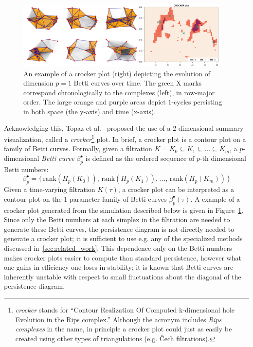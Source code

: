 \documentclass{siamart190516}
\begin{document}
\begin{figure}[t]
	\centering
	\includegraphics[width=0.95\textwidth]{crocker_combo_1.png}
	\caption{An example of a crocker plot (right) depicting the evolution of dimension $p = 1$ Betti curves over time. The green $\mathrm{X}$ marks correspond chronologically to the complexes (left), in row-major order. The large orange and purple areas depict $1$-cycles persisting in both space (the y-axis) and time (x-axis). }\label{fig:crocker1}
\end{figure}

Acknowledging this, Topaz et al.~\cite{topaz2015topological} proposed the use of a 2-dimensional summary visualization, called a \emph{crocker}\footnote{\emph{crocker} stands for ``Contour Realization Of Computed k-dimensional hole Evolution in the Rips complex.'' Although the acronym includes \emph{Rips complexes} in the name, in principle a crocker plot could just as easily be created using other types of triangulations (e.g. \v{C}ech filtrations).} plot. 
In brief, a crocker plot is a contour plot on a family of Betti curves. Formally, given a filtration $K = K_0 \subseteq K_1 \subseteq \dots \subseteq K_m$, a $p$-dimensional \emph{Betti curve} $\beta_p^{\bullet}$ is defined as the ordered sequence of $p$-th dimensional Betti numbers:
$$ \beta_p^\bullet = \{ \, \mathrm{rank}(H_p(K_0)), \, \mathrm{rank}(H_p(K_1)), \, \dots, \, \mathrm{rank}(H_p(K_m))\, \}$$
Given a time-varying filtration $K(\tau)$, a crocker plot can be interpreted as a contour plot on the 1-parameter family of Betti curves $\beta_p^\bullet(\tau)$. A example of a crocker plot generated from the simulation described below is given in Figure~\ref{fig:crocker1}. Since only the Betti numbers at each simplex in the filtration are needed to generate these Betti curves, the persistence diagram is not directly needed to generate a crocker plot; it is sufficient to use e.g. any of the specialized methods discussed in~\ref{sec:related_work}. This dependence only on the Betti numbers makes crocker plots easier to compute than standard persistence, however what one gains in efficiency one loses in stability; it is known that Betti curves are inherently unstable with respect to small fluctuations about the diagonal of the persistence diagram. 
\end{document}

